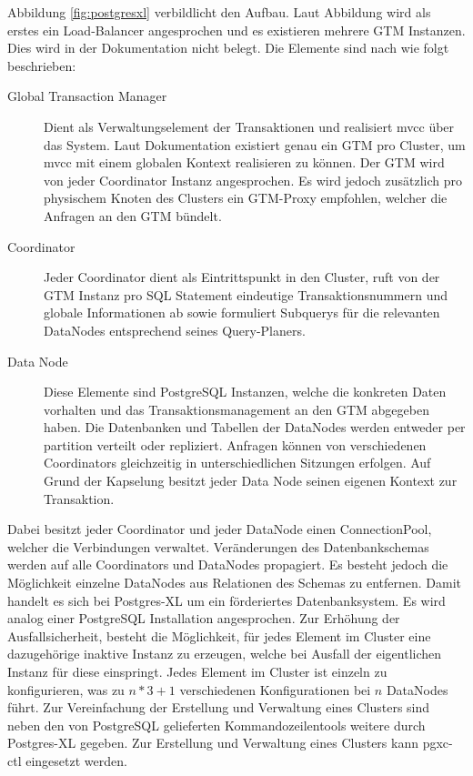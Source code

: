 Abbildung \ref{fig:postgresxl} verbildlicht den Aufbau.
Laut Abbildung wird als erstes ein Load-Balancer angesprochen und es existieren mehrere GTM Instanzen.
Dies wird in der Dokumentation nicht belegt.
Die Elemente sind nach \cite{website:postgresxl-about} wie folgt beschrieben:
\begin{description}
\item[Global Transaction Manager] Dient als Verwaltungselement der Transaktionen und realisiert \Gls{mvcc} über das System. Laut Dokumentation existiert genau ein GTM pro Cluster, um \Gls{mvcc}  mit einem globalen Kontext realisieren zu können. Der GTM wird von jeder Coordinator Instanz angesprochen. Es wird jedoch zusätzlich pro physischem Knoten des Clusters ein GTM-Proxy empfohlen, welcher die Anfragen an den GTM bündelt.
\item[Coordinator] Jeder Coordinator dient als Eintrittspunkt in den Cluster, ruft von der GTM Instanz pro SQL Statement eindeutige Transaktionsnummern und globale Informationen ab sowie formuliert Subquerys für die relevanten DataNodes entsprechend seines Query-Planers.
\item[Data Node] Diese Elemente sind PostgreSQL Instanzen, welche die konkreten Daten vorhalten und das Transaktionsmanagement an den GTM abgegeben haben. Die Datenbanken und Tabellen der DataNodes werden entweder per partition verteilt oder repliziert. Anfragen können von verschiedenen Coordinators gleichzeitig in unterschiedlichen Sitzungen erfolgen. Auf Grund der Kapselung besitzt jeder Data Node seinen eigenen Kontext zur Transaktion.
\end{description}
Dabei besitzt jeder Coordinator und jeder DataNode einen ConnectionPool, welcher die Verbindungen verwaltet.
Veränderungen des Datenbankschemas werden auf alle Coordinators und DataNodes propagiert.
Es besteht jedoch die Möglichkeit einzelne DataNodes aus Relationen des Schemas zu entfernen.
Damit handelt es sich bei Postgres-XL um ein förderiertes Datenbanksystem.
Es wird analog einer PostgreSQL Installation angesprochen.
Zur Erhöhung der Ausfallsicherheit, besteht die Möglichkeit, für jedes Element im Cluster eine dazugehörige inaktive Instanz zu erzeugen, welche bei Ausfall der eigentlichen Instanz für diese einspringt.
Jedes Element im Cluster ist einzeln zu konfigurieren, was zu $ n*3+1 $ verschiedenen Konfigurationen bei $n$ DataNodes führt.
Zur Vereinfachung der Erstellung und Verwaltung eines Clusters sind neben den von PostgreSQL gelieferten Kommandozeilentools weitere durch Postgres-XL gegeben.
Zur Erstellung und Verwaltung eines Clusters kann pgxc-ctl eingesetzt werden.
